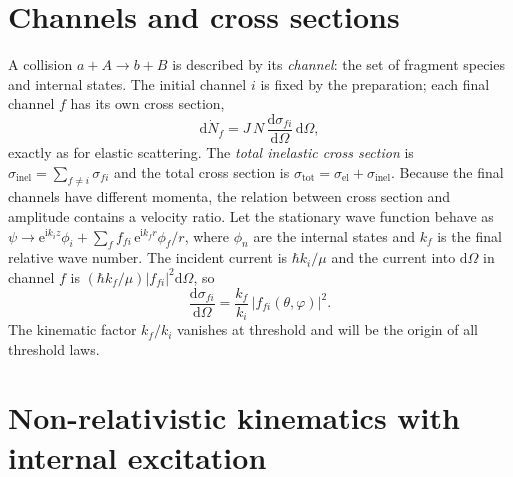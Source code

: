 \documentclass[11pt,a4paper]{book}
\numberwithin{equation}{chapter}
\newcommand{\dd}{\mathrm{d}}
\newcommand{\ii}{\mathrm{i}}
\newcommand{\ee}{\mathrm{e}}
\begin{document}
\section{Channels and cross sections}

A collision $a+A\to b+B$ is described by its \emph{channel}: the set of fragment
species and internal states. The initial channel $i$ is fixed by the
preparation; each final channel $f$ has its own cross section,
\begin{equation}\label{eq:sigfi-def}
  \dd\dot N_f=J\,N\,\frac{\dd\sigma_{fi}}{\dd\Omega}\,\dd\Omega ,
\end{equation}
exactly as for elastic scattering. The \emph{total inelastic cross section} is
$\sigma_{\mathrm{inel}}=\sum_{f\neq i}\sigma_{fi}$ and the total cross section is
$\sigma_{\mathrm{tot}}=\sigma_{\mathrm{el}}+\sigma_{\mathrm{inel}}$. Because the
final channels have different momenta, the relation between cross section and
amplitude contains a velocity ratio. Let the stationary wave function behave as
$\psi\to\ee^{\ii k_iz}\phi_i+\sum_f f_{fi}\,\ee^{\ii k_fr}\phi_f/r$, where
$\phi_n$ are the internal states and $k_f$ is the final relative wave number.
The incident current is $\hbar k_i/\mu$ and the current into $\dd\Omega$ in
channel $f$ is $(\hbar k_f/\mu)|f_{fi}|^2\dd\Omega$, so
\begin{equation}\label{eq:sigfi}
  \frac{\dd\sigma_{fi}}{\dd\Omega}=\frac{k_f}{k_i}\,|f_{fi}(\theta,\varphi)|^2 .
\end{equation}
The kinematic factor $k_f/k_i$ vanishes at threshold and will be the origin of
all threshold laws.

\section{Non-relativistic kinematics with internal excitation}
\end{document}
